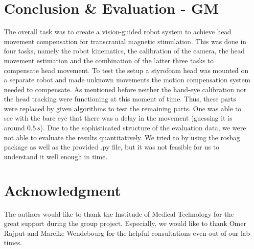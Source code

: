 \documentclass[conference]{IEEEtran}
\begin{document}
\section{Conclusion \& Evaluation - GM}
The overall task was to create a vision-guided robot system to achieve head movement compensation for transcranial magnetic stimulation. This was done in four tasks, namely the robot kinematics, the calibration of the camera, the head movement estimation and the combination of the latter three tasks to compensate head movement. To test the setup a styrofoam head was mounted on a separate robot and made unknown movements the motion compensation system needed to compensate. As mentioned before neither the hand-eye calibration nor the head tracking were functioning at this moment of time. Thus, these parts were replaced by given algorithms to test the remaining parts. One was able to see with the bare eye that there was a delay in the movement (guessing it is around $0.5\,s$). Due to the sophisticated structure of the evaluation data, we were not able to evaluate the results quantitatively. We tried to by using the rosbag package as well as the provided .py file, but it was not feasible for us to understand it well enough in time.






\section*{Acknowledgment}

The authors would like to thank the Institude of Medical Technology for the great support during the group project. Especially, we would like to thank Omer Rajput and Mareike Wendebourg for the helpful consultations even out of our lab times.








%

\end{document}

